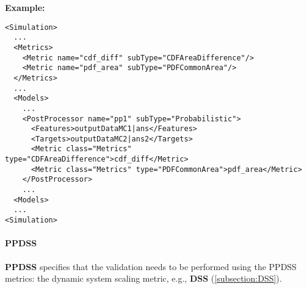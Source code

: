 \textbf{Example:}
\begin{lstlisting}[style=XML,morekeywords={subType}]
<Simulation>
  ...
  <Metrics>
    <Metric name="cdf_diff" subType="CDFAreaDifference"/>
    <Metric name="pdf_area" subType="PDFCommonArea"/>
  </Metrics>
  ...
  <Models>
    ...
    <PostProcessor name="pp1" subType="Probabilistic">
      <Features>outputDataMC1|ans</Features>
      <Targets>outputDataMC2|ans2</Targets>
      <Metric class="Metrics" type="CDFAreaDifference">cdf_diff</Metric>
      <Metric class="Metrics" type="PDFCommonArea">pdf_area</Metric>
    </PostProcessor>
    ...
  <Models>
  ...
<Simulation>
\end{lstlisting}

\paragraph{PPDSS}
\textbf{PPDSS} specifies that the validation needs to be performed
using the PPDSS metrics: the dynamic system scaling metric, e.g., \textbf{DSS} (\ref{subsection:DSS}).

%
%


